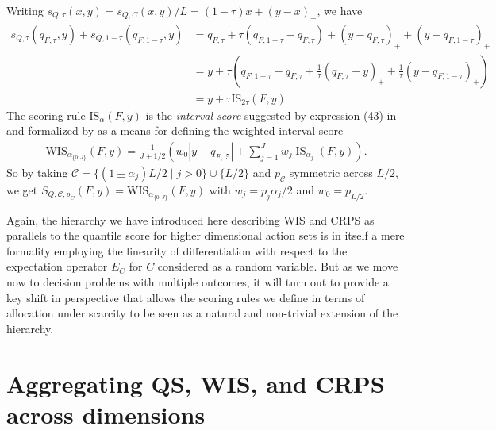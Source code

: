 \documentclass{article}
\begin{document}
Writing $s_{Q,\tau}(x,y) = s_{Q,C}(x,y)/L = (1-\tau)x + (y-x)_{+}$, we have
\begin{align}
s_{Q,\tau}(q_{F,\tau},y) + s_{Q,1-\tau}(q_{F,1-\tau},y) &= q_{F,\tau} + \tau(q_{F,1-\tau} - q_{F,\tau}) + (y - q_{F,\tau})_{+} + (y - q_{F,1-\tau})_{+} \\
&= y + \tau\left(q_{F,1-\tau} - q_{F,\tau} + \frac{1}{\tau}(q_{F,\tau} - y)_{+} + \frac{1}{\tau}(y - q_{F,1-\tau})_{+}\right) \\
&= y + \tau \mathrm{IS}_{2\tau}(F,y)
\end{align}
The scoring rule $\mathrm{IS}_{\alpha}(F,y)$ is the \emph{interval score} suggested by expression (43) in \cite{gneiting2007strictly} 
and formalized by \cite{bracher2021evaluating} as a means for defining the weighted interval score 
\begin{align}
\mathrm{WIS}_{\alpha_{\{0: J\}}}(F, y)=\frac{1}{J+1 / 2}\left(w_0 |y-q_{F,.5}|+\sum_{j=1}^J w_j \operatorname{IS}_{\alpha_j}(F, y)\right).
\end{align}
So by taking $\mathcal{C} = \{(1 \pm \alpha_j)L/2 \mid j > 0\}\cup \{L/2\}$ and $p_\mathcal{C}$ symmetric across $L/2$, we get 
$S_{Q,\mathcal{C}, p_C}(F,y) = \mathrm{WIS}_{\alpha_{\{0: J\}}}(F, y)$ with $w_j = p_{j}\alpha_j/2$ and $w_0 = p_{L/2}$.


Again, the hierarchy we have introduced here describing WIS and CRPS as parallels to the quantile score for higher dimensional action sets is in itself a mere formality employing the linearity of differentiation with respect to the expectation operator $E_{C}$ for $C$ considered as a random variable. But as we move now to decision problems with multiple outcomes, it will turn out to provide a key shift in perspective that allows the scoring rules we define in terms of allocation under scarcity to be seen as a natural and non-trivial extension of the hierarchy. 


\section{Aggregating QS, WIS, and CRPS across dimensions}
\end{document}
